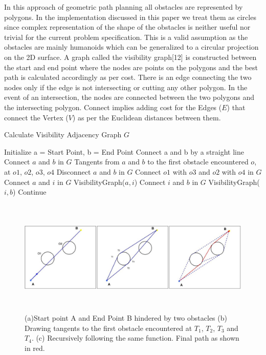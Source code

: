 \documentclass[letterpaper, 10 pt, conference]{ieeeconf}  %
\begin{document}
In this approach of geometric path planning all obstacles are represented by polygons. In the  implementation discussed in this paper we treat them as circles since complex representation of the shape of the obstacles is neither useful nor trivial for the current problem specification. This is a valid assumption as the obstacles are mainly humanoids which can be generalized to a circular projection on the 2D surface. A graph called the visibility graph[12] is constructed between the start and end point where the nodes are points on the polygons and the best path is calculated accordingly as per cost. There is an edge connecting the two nodes only if the edge is not intersecting or cutting any other polygon. In the event of an intersection, the nodes
are connected between the two polygons and the intersecting polygon. Connect implies adding cost for the Edges ($E$) that connect the Vertex ($V$) as per the Euclidean distances between them.

\begin{algorithm}
\caption{Calculate Visibility Adjacency Graph $G$}
\begin{algorithmic}[1]
\State Initialize a = Start Point, b = End Point
\State Connect a and b by a straight line
\State Connect $a$ and $b$ in $G$ 
\State Tangents from $a$ and $b$ to the first obstacle
encountered $o$, at $o1$, $o2$, $o3$, $o4$
\State Disconnect $a$ and $b$ in $G$
\State Connect $o1$ with $o3$ and $o2$ with $o4$ in $G$
\State Connect $a$ and $i$ in $G$
\State VisibilityGraph($a,i$)
\EndFor
{}
\State Connect $i$ and $b$ in $G$
\State VisibilityGraph($i,b$)
\EndFor
\Else
\State Continue
\EndIf
\EndProcedure
\end{algorithmic}
\end{algorithm}



\begin{figure} 
\centering
\includegraphics[width=\textwidth,height=5.5cm]{path_paper.jpg}
\caption{(a)Start point A and End Point B hindered by two obstacles (b) Drawing tangents to the first obstacle encountered at $T_{1}$, $T_{2}$, $T_{3}$ and $T_{4}$. (c) Recursively following the same function. Final path as shown in red. }
\end{figure}
\end{document}
